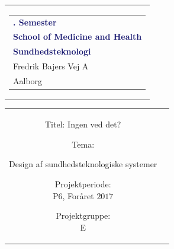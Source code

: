 % 
\thispagestyle{empty}
\begin{nopagebreak}
	{\samepage 
		
		\begin{tabular}{r}
			\parbox{\textwidth}{  
				\hfill \hspace{2cm} \parbox{8cm}{\begin{tabular}{l} %
						{\small \textbf{\textcolor{MidnightBlue}{{$6$. Semester}}}}\\
						{\small \textbf{\textcolor{MidnightBlue}{School of Medicine and Health}}}\\
						{\small \textbf{\textcolor{MidnightBlue}{Sundhedsteknologi}}}\\
						{\small \textcolor{NavyBlue}{Fredrik Bajers Vej $7$A}} \\
						{\small \textcolor{NavyBlue}{$9220$ Aalborg}} \\
			\end{tabular}}}
		\end{tabular}
		
		\begin{tabular}{cc}
			\parbox{7cm}{
				\begin{description}

\item {Titel:}
Ingen ved det?
\\

\item {Tema:} 

\small{
Design af sundhedsteknologiske systemer
}

\end{description}

\parbox{8cm}{

\begin{description}
\item {Projektperiode:}\\
   P$6$, Foråret $2017$\\
   
\item {Projektgruppe:}\\
  E\\
  

\end{description}}}
\end{tabular}}
\end{nopagebreak}
